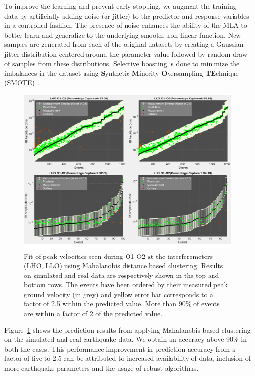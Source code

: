 \documentclass[preprint, aps, showpacs]{revtex4-1}
\begin{document}
To improve the learning and prevent early stopping, we augment the training data by artificially adding noise (or jitter) to the predictor and response variables in a controlled fashion. The presence of noise enhances the ability of the MLA to better learn and generalize to the underlying smooth, non-linear function. New samples are generated from each of the original datasets by creating a Gaussian jitter distribution centered around the parameter value followed by random draw of samples from these distributions. Selective boosting is done to minimize the imbalances in the dataset using \textbf{S}ynthetic \textbf{M}inority \textbf{O}versampling \textbf{TE}chnique (SMOTE) \cite{ChBo2011}. 

\begin{figure}[!htb]
\hspace*{-0.5cm}
 \includegraphics[width=\textwidth]{./plots/ClusteringPrediction.pdf}
 \caption{Fit of peak velocities seen during O1-O2 at the interferometers (LHO, LLO) using Mahalanobis distance based clustering. Results on simulated and real data are respectively shown in the top and bottom rows. The events have been ordered by their measured peak ground velocity (in grey) and yellow error bar corresponds to a factor of 2.5 within the predicted value. More than 90\% of events are within a factor of 2 of the predicted value.}
 \label{fig:regression}
\end{figure}

Figure~\ref{fig:regression} shows the prediction results from applying Mahalanobis based clustering on the simulated and real earthquake data. We obtain an accuracy above 90\% in both the cases. This performance improvement in prediction accuracy from a factor of five to 2.5 can be attributed to increased availability of data, inclusion of more earthquake parameters and the usage of robust algorithms.
\end{document}
